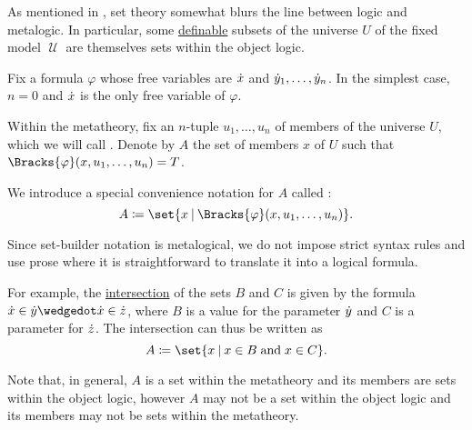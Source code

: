 \begin{definition}\label{def:set_builder_notation}\mimprovised
  As mentioned in , set theory somewhat blurs the line between logic and metalogic. In particular, some \hyperref[def:first_order_definability]{definable} subsets of the universe \( U \) of the fixed model \( \mscrU \) are themselves sets within the object logic.

  Fix a formula \( \varphi \) whose free variables are \( {\dot{x}} \) and \( {\dot{y}}_1, \ldots, {\dot{y}}_n \). In the simplest case, \( n = 0 \) and \( {\dot{x}} \) is the only free variable of \( \varphi \).

  Within the metatheory, fix an \( n \)-tuple \( u_1, \ldots, u_n \) of members of the universe \( U \), which we will call . Denote by \( A \) the set of members \( x \) of \( U \) such that \( \Bracks{\varphi}(x, u_1, \ldots, u_n) = T \).

  We introduce a special convenience notation for \( A \) called :
  \begin{equation*}
    A \coloneqq \set{ x \given \Bracks{\varphi}(x, u_1, \ldots, u_n) }.
  \end{equation*}

  Since set-builder notation is metalogical, we do not impose strict syntax rules and use prose where it is straightforward to translate it into a logical formula.

  For example, the \hyperref[def:basic_set_operations/intersection]{intersection} of the sets \( B \) and \( C \) is given by the formula \( \synx \in \syny \synwedge \synx \in \synz \), where \( B \) is a value for the parameter \( {\dot{y}} \) and \( C \) is a parameter for \( {\dot{z}} \). The intersection can thus be written as
  \begin{equation*}
    A \coloneqq \set{ x \given x \in B \T{and} x \in C }.
  \end{equation*}

  Note that, in general, \( A \) is a set within the metatheory and its members are sets within the object logic, however \( A \) may not be a set within the object logic and its members may not be sets within the metatheory.


\end{definition}
